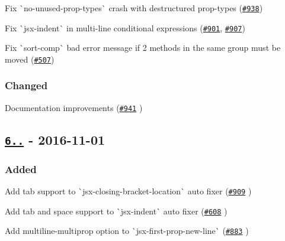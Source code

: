 \begin{DoxyItemize}
\item Fix \`{}no-\/unused-\/prop-\/types\`{} crash with destructured prop-\/types (\href{https://github.com/yannickcr/eslint-plugin-react/issues/938}{\tt \#938})
\item Fix \`{}jsx-\/indent\`{} in multi-\/line conditional expressions (\href{https://github.com/yannickcr/eslint-plugin-react/issues/901}{\tt \#901}, \href{https://github.com/yannickcr/eslint-plugin-react/issues/907}{\tt \#907})
\item Fix \`{}sort-\/comp\`{} bad error message if 2 methods in the same group must be moved (\href{https://github.com/yannickcr/eslint-plugin-react/issues/507}{\tt \#507})
\end{DoxyItemize}

\subsubsection*{Changed}


\begin{DoxyItemize}
\item Documentation improvements (\href{https://github.com/yannickcr/eslint-plugin-react/pull/941}{\tt \#941} )
\end{DoxyItemize}

\subsection*{\href{https://github.com/yannickcr/eslint-plugin-react/compare/v6.4.1...v6.5.0}{\tt 6..} -\/ 2016-\/11-\/01}

\subsubsection*{Added}


\begin{DoxyItemize}
\item Add tab support to \`{}jsx-\/closing-\/bracket-\/location\`{} auto fixer (\href{https://github.com/yannickcr/eslint-plugin-react/pull/909}{\tt \#909} )
\item Add tab and space support to \`{}jsx-\/indent\`{} auto fixer (\href{https://github.com/yannickcr/eslint-plugin-react/pull/608}{\tt \#608} )
\item Add {\ttfamily multiline-\/multiprop} option to \`{}jsx-\/first-\/prop-\/new-\/line\`{} (\href{https://github.com/yannickcr/eslint-plugin-react/pull/883}{\tt \#883} )
\end{DoxyItemize}

